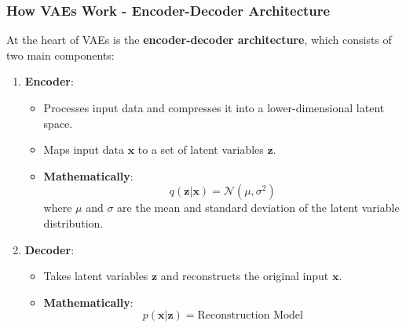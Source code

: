 \documentclass[aspectratio=169]{beamer}
\begin{document}
\begin{frame}[fragile]
    \frametitle{How VAEs Work - Encoder-Decoder Architecture}
    
    At the heart of VAEs is the \textbf{encoder-decoder architecture}, which consists of two main components:

    \begin{enumerate}
        \item \textbf{Encoder}:
            \begin{itemize}
                \item Processes input data and compresses it into a lower-dimensional latent space.
                \item Maps input data \( \mathbf{x} \) to a set of latent variables \( \mathbf{z} \).
                \item \textbf{Mathematically}: 
                \begin{equation}
                    q(\mathbf{z} | \mathbf{x}) = \mathcal{N}(\mu, \sigma^2)
                \end{equation}
                where \( \mu \) and \( \sigma \) are the mean and standard deviation of the latent variable distribution.
            \end{itemize}
            
        \item \textbf{Decoder}:
            \begin{itemize}
                \item Takes latent variables \( \mathbf{z} \) and reconstructs the original input \( \mathbf{x} \).
                \item \textbf{Mathematically}:
                \begin{equation}
                    p(\mathbf{x} | \mathbf{z}) = \text{Reconstruction Model}
                \end{equation}
            \end{itemize}
    \end{enumerate}

\end{frame}
\end{document}
